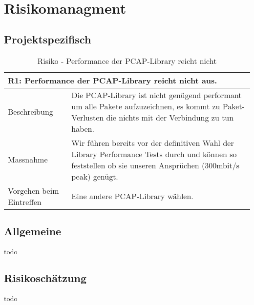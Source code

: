\section{Risikomanagment}
\label{sec:Risikomanagment}

\subsection{Projektspezifisch}

\begin{table}[H]
\begin{tabularx}{\textwidth}{l|>{\raggedright\arraybackslash}X}
\multicolumn{2}{l}{\textbf{R1: Performance der \ac{PCAP}-Library reicht nicht aus.}} \\
\hline
Beschreibung & Die \ac{PCAP}-Library ist nicht genügend performant um alle Pakete aufzuzeichnen, es kommt zu Paket-Verlusten die nichts mit der Verbindung zu tun haben. \\
\hline
Massnahme & Wir führen bereits vor der definitiven Wahl der Library Performance Tests durch und können so feststellen ob sie unseren Ansprüchen (300mbit/s peak) genügt. \\
\hline
Vorgehen beim Eintreffen & Eine andere \ac{PCAP}-Library wählen.\\
\end{tabularx}
\caption{Risiko - Performance der \ac{PCAP}-Library reicht nicht}
\end{table}

\subsection{Allgemeine}
todo

\subsection{Risikoschätzung}
todo
